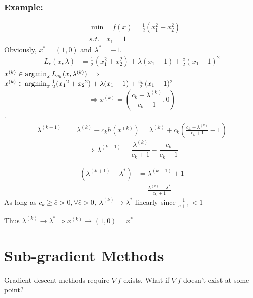 \documentclass[11pt,a4paper]{article}
\newcommand{\argmin}{\operatornamewithlimits{argmin}}
\begin{document}
\subsubsection*{Example:}
\begin{equation}
    \begin{aligned}
        &\min\quad f(x)=\frac{1}{2}(x_1^2+x_2^2)\\
        &s.t.\quad x_1=1
    \end{aligned}
    \nonumber
\end{equation}
Obviously, $x^*=(1,0)$ and $\lambda^*=-1$.
\begin{equation}
    \begin{aligned}
        L_c(x,\lambda)&=\frac{1}{2}(x_1^2+x_2^2)+\lambda(x_1-1)+\frac{c}{2}(x_1-1)^2
    \end{aligned}
    \nonumber
\end{equation}
$x^{(k)}\in\argmin_{x}L_{c_k}(x,\lambda^{(k)})$ $\Rightarrow$ $x^{(k)}\in\argmin_{x}\frac{1}{2}({x_1}^2+{x_2}^2)+\lambda({x_1}-1)+\frac{c_k}{2}({x_1}-1)^2$ $$\Rightarrow x^{(k)}=\left(\frac{c_k-\lambda^{(k)}}{c_k+1},0\right)$$.
\begin{equation}
    \begin{aligned}
        \lambda^{(k+1)}&=\lambda^{(k)}+c_k h(x^{(k)})=\lambda^{(k)}+c_k \left(\frac{c_k-\lambda^{(k)}}{c_k+1}-1\right)
    \end{aligned}
    \nonumber
\end{equation}
$$\Rightarrow \lambda^{(k+1)}=\frac{\lambda^{(k)}}{c_k+1}-\frac{c_k}{c_k+1}$$

\begin{equation}
    \begin{aligned}
        (\lambda^{(k+1)}-\lambda^*)&=\lambda^{(k+1)}+1\\
        &=\frac{\lambda^{(k)}-\lambda^*}{c_k+1}
    \end{aligned}
    \nonumber
\end{equation}
As long as $c_k\geq \bar{c}> 0,\forall \bar{c}>0$, $\lambda^{(k)}\rightarrow \lambda^*$ linearly since $\frac{1}{\bar{c}+1}<1$

Thus $\lambda^{(k)}\rightarrow \lambda^* \Rightarrow x^{(k)} \rightarrow (1,0)=x^*$

\section{Sub-gradient Methods}
Gradient descent methods require $\nabla f$ exists. What if $\nabla f$ doesn't exist at some point?
\end{document}
